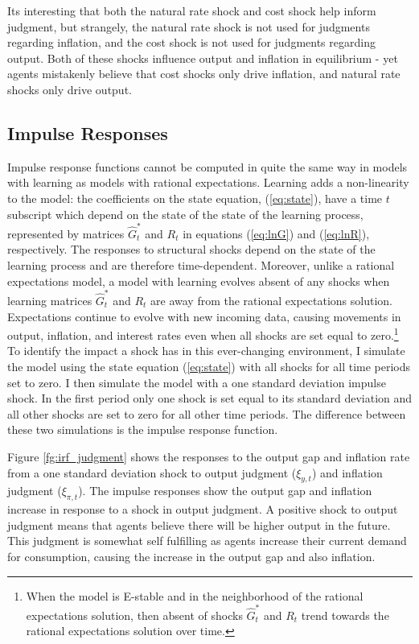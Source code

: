 \documentclass[12pt]{article}
\begin{document}
{Its interesting that both the natural rate shock and cost shock help inform judgment, but strangely, the natural rate shock is not used for judgments regarding inflation, and the cost shock is not used for judgments regarding output.  Both of these shocks influence output and inflation in equilibrium - yet agents mistakenly believe that cost shocks only drive inflation, and natural rate shocks only drive output.

\subsection{Impulse Responses}
Impulse response functions cannot be computed in quite the same way in models with learning as models with rational expectations.  Learning adds a non-linearity to the model: the coefficients on the state equation, (\ref{eq:state}), have a time $t$ subscript which depend on the state of the state of the learning process, represented by matrices $\hat{G}_t^*$ and $R_t$ in equations (\ref{eq:lnG}) and (\ref{eq:lnR}), respectively.  The responses to structural shocks depend on the state of the learning process and are therefore time-dependent.  Moreover, unlike a rational expectations model, a model with learning evolves absent of any shocks when learning matrices $\hat{G}_t^*$ and $R_t$ are away from the rational expectations solution.  Expectations continue to evolve with new incoming data, causing movements in output, inflation, and interest rates even when all shocks are set equal to zero.\footnote{When the model is E-stable and in the neighborhood of the rational expectations solution, then absent of shocks $\hat{G}_t^*$ and $R_t$ trend towards the rational expectations solution over time.}  To identify the impact a shock has in this ever-changing environment, I simulate the model using the state equation (\ref{eq:state}) with all shocks for all time periods set to zero.  I then simulate the model with a one standard deviation impulse shock.  In the first period only one shock is set equal to its standard deviation and all other shocks are set to zero for all other time periods.  The difference between these two simulations is the impulse response function. 

Figure \ref{fg:irf_judgment} shows the responses to the output gap and inflation rate from a one standard deviation shock to output judgment ($\xi_{y,t}$) and inflation judgment ($\xi_{\pi,t}$).  The impulse responses show the output gap and inflation increase in response to a shock in output judgment.  A positive shock to output judgment means that agents believe there will be higher output in the future.  This judgment is somewhat self fulfilling as agents increase their current demand for consumption, causing the increase in the output gap and also inflation.  

}
\end{document}
